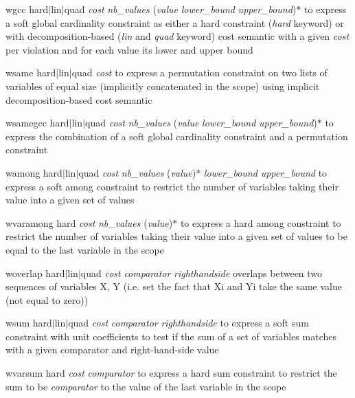 \documentclass{article}
\begin{document}
\begin{DoxyItemize}
\begin{DoxyItemize}
\item wgcc hard$\vert$lin$\vert$quad {\itshape cost} {\itshape nb\-\_\-values} ({\itshape value} {\itshape lower\-\_\-bound} {\itshape upper\-\_\-bound})$\ast$ to express a soft global cardinality constraint as either a hard constraint ({\itshape hard} keyword) or with decomposition-\/based ({\itshape lin} and {\itshape quad} keyword) cost semantic with a given {\itshape cost} per violation and for each value its lower and upper bound
\item wsame hard$\vert$lin$\vert$quad {\itshape cost} to express a permutation constraint on two lists of variables of equal size (implicitly concatenated in the scope) using implicit decomposition-\/based cost semantic
\item wsamegcc hard$\vert$lin$\vert$quad {\itshape cost} {\itshape nb\-\_\-values} ({\itshape value} {\itshape lower\-\_\-bound} {\itshape upper\-\_\-bound})$\ast$ to express the combination of a soft global cardinality constraint and a permutation constraint
\item wamong hard$\vert$lin$\vert$quad {\itshape cost} {\itshape nb\-\_\-values} ({\itshape value})$\ast$ {\itshape lower\-\_\-bound} {\itshape upper\-\_\-bound} to express a soft among constraint to restrict the number of variables taking their value into a given set of values
\item wvaramong hard {\itshape cost} {\itshape nb\-\_\-values} ({\itshape value})$\ast$ to express a hard among constraint to restrict the number of variables taking their value into a given set of values to be equal to the last variable in the scope
\item woverlap hard$\vert$lin$\vert$quad {\itshape cost} {\itshape comparator} {\itshape righthandside} overlaps between two sequences of variables X, Y (i.\-e. set the fact that Xi and Yi take the same value (not equal to zero))
\item wsum hard$\vert$lin$\vert$quad {\itshape cost} {\itshape comparator} {\itshape righthandside} to express a soft sum constraint with unit coefficients to test if the sum of a set of variables matches with a given comparator and right-\/hand-\/side value
\item wvarsum hard {\itshape cost} {\itshape comparator} to express a hard sum constraint to restrict the sum to be {\itshape comparator} to the value of the last variable in the scope


\end{DoxyItemize}
\end{DoxyItemize}
\end{document}
